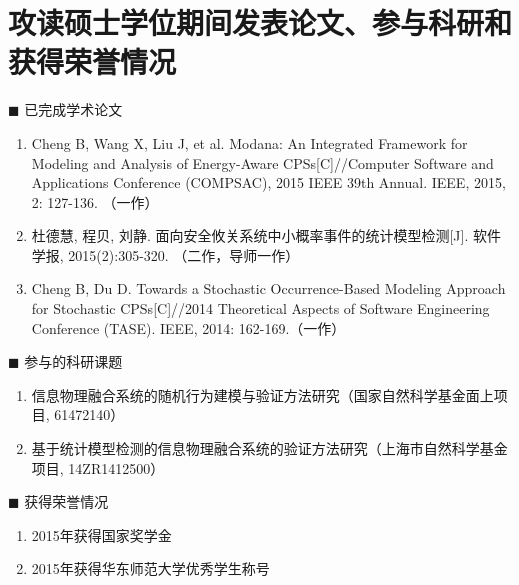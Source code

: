 \chapter*{\large 攻读硕士学位期间发表论文、参与科研和获得荣誉情况}
\vskip 2mm
\vspace{-1cm}
\renewcommand{\labelenumi}{[\arabic{enumi}]}
{\heiti $\blacksquare$ 已完成学术论文}\vskip 3mm
\begin{enumerate}
	\item Cheng B, Wang X, Liu J, et al. Modana: An Integrated Framework for Modeling and Analysis of Energy-Aware CPSs[C]//Computer Software and Applications Conference (COMPSAC), 2015 IEEE 39th Annual. IEEE, 2015, 2: 127-136. （一作）
	\item 杜德慧, 程贝, 刘静. 面向安全攸关系统中小概率事件的统计模型检测[J]. 软件学报, 2015(2):305-320. （二作，导师一作）
	\item Cheng B, Du D. Towards a Stochastic Occurrence-Based Modeling Approach for Stochastic CPSs[C]//2014 Theoretical Aspects of Software Engineering Conference (TASE). IEEE, 2014: 162-169.（一作）
	
\end{enumerate}


{\heiti $\blacksquare$ 参与的科研课题}\vskip 3mm
\begin{enumerate}
	
	\item
	信息物理融合系统的随机行为建模与验证方法研究（国家自然科学基金面上项目, 61472140）
	
	\item
	基于统计模型检测的信息物理融合系统的验证方法研究（上海市自然科学基金项目, 14ZR1412500）
	
\end{enumerate}

{\heiti $\blacksquare$ 获得荣誉情况}\vskip 3mm
\begin{enumerate}
	
	\item
	2015年获得国家奖学金
	
	\item
	2015年获得华东师范大学优秀学生称号
	
\end{enumerate}
